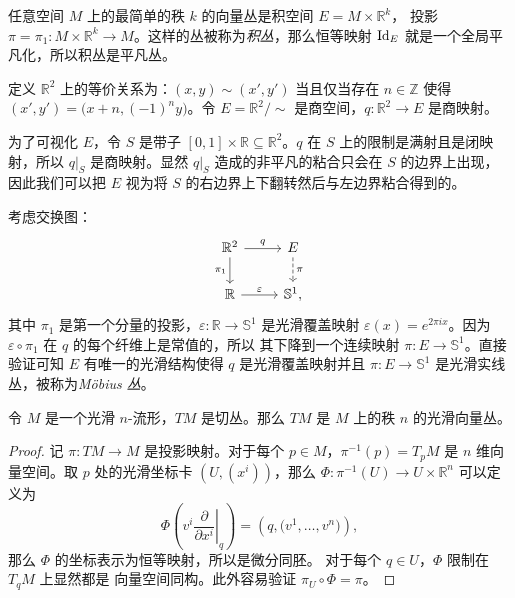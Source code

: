 \begin{example}[积丛]
  任意空间 $M$ 上的最简单的秩 $k$ 的向量丛是积空间 $E=M\times \mathbb{R}^k$，
  投影 $\pi=\pi_1:M\times \mathbb{R}^k\to M$。这样的丛被称为\emph{积丛}，那么恒等映射
  $\operatorname{Id}_E$ 就是一个全局平凡化，所以积丛是平凡丛。
\end{example}

\begin{example}[M\"obius 丛]
  定义 $\mathbb{R}^2$ 上的等价关系为：$(x,y)\sim (x',y')$ 当且仅当存在 $n\in \mathbb{Z}$ 使得 
  $(x',y')=\bigl(x+n,(-1)^ny\bigr)$。令 $E=\mathbb{R}^2/\sim$ 是商空间，$q:\mathbb{R}^2\to E$
  是商映射。

  为了可视化 $E$，令 $S$ 是带子 $[0,1]\times \mathbb{R}\subseteq \mathbb{R}^2$。$q$ 在 $S$
  上的限制是满射且是闭映射，所以 $q|_S$ 是商映射。显然 $q|_S$ 造成的非平凡的粘合只会在 $S$
  的边界上出现，因此我们可以把 $E$ 视为将 $S$ 的右边界上下翻转然后与左边界粘合得到的。

  考虑交换图：
  \[
    \begin{tikzcd}
      \mathbb{R}^2\arrow[r,"q"]\arrow[d,"\pi_1"'] & E\arrow[d,dashed,"\pi"] \\
      \mathbb{R}\arrow[r,"\varepsilon"] & \mathbb{S}^1,
    \end{tikzcd}
  \]
  其中 $\pi_1$ 是第一个分量的投影，$\varepsilon: \mathbb{R}\to \mathbb{S}^1$ 是光滑覆盖映射
  $\varepsilon(x)=e^{2\pi ix}$。因为 $\varepsilon\circ\pi_1$ 在 $q$ 的每个纤维上是常值的，所以
  其下降到一个连续映射 $\pi:E\to \mathbb{S}^1$。直接验证可知 $E$ 有唯一的光滑结构使得
  $q$ 是光滑覆盖映射并且 $\pi:E\to \mathbb{S}^1$ 是光滑实线丛，被称为\emph{M\"obius 丛}。
  
\end{example}

\begin{proposition}[切丛作为向量丛]
  令 $M$ 是一个光滑 $n$-流形，$TM$ 是切丛。那么
  $TM$ 是 $M$ 上的秩 $n$ 的光滑向量丛。
\end{proposition}
\begin{proof}
  记 $\pi:TM\to M$ 是投影映射。对于每个 $p\in M$，$\pi^{-1}(p)=T_pM$
  是 $n$ 维向量空间。取 $p$ 处的光滑坐标卡 $(U,(x^i))$，那么
  $\varPhi:\pi^{-1}(U)\to U\times \mathbb{R}^n$ 可以定义为
  \[
    \varPhi\left(v^i\left.\frac{\partial}{\partial x^i}\right|_q\right) 
    =\left(q,\bigl(v^1,\dots,v^n\bigr)\right),
  \]
  那么 $\varPhi$ 的坐标表示为恒等映射，所以是微分同胚。
  对于每个 $q\in U$，$\varPhi$ 限制在 $T_qM$ 上显然都是
  向量空间同构。此外容易验证 $\pi_U\circ \varPhi=\pi$。
\end{proof}
 
